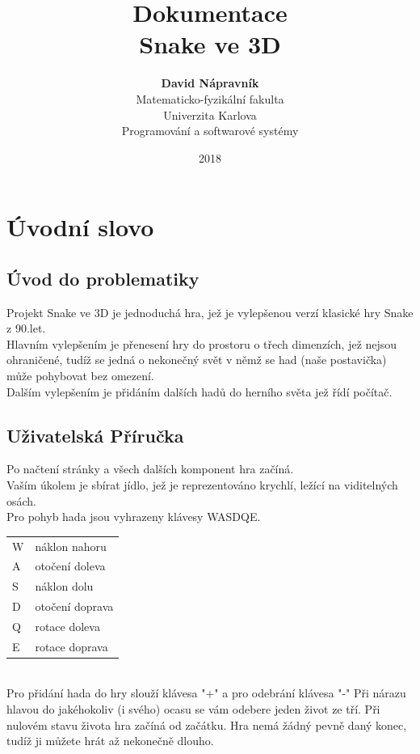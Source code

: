 \documentclass[a4paper,titlepage]{article}
\title{
	Dokumentace\\
	\textbf{Snake ve 3D}
}
\author{
	\textbf{David Nápravník}\\
	Matematicko-fyzikální fakulta\\
	Univerzita Karlova\\
	Programování a softwarové systémy
}
\date{2018}
\begin{document}
	\maketitle
	\tableofcontents
	\newpage
	
	\section{Úvodní slovo}
	\subsection{Úvod do problematiky}
		Projekt Snake ve 3D je jednoduchá hra, jež je vylepšenou verzí klasické hry Snake z 90.let.\cite{Snake-wikipedie}\\
		Hlavním vylepšením je přenesení hry do prostoru o třech dimenzích, jež nejsou ohraničené, tudíž se
		jedná o nekonečný svět v němž se had (naše postavička) může pohybovat bez omezení.\\
		Dalším vylepšením je přidáním dalších hadů do herního světa jež řídí počítač.
	\subsection{Uživatelská Příručka}
		Po načtení stránky a všech dalších komponent hra začíná.\\
		Vaším úkolem je sbírat jídlo, jež je reprezentováno krychlí, ležící na viditelných osách.\\
		Pro pohyb hada jsou vyhrazeny klávesy WASDQE.		
		\begin{table}[ht]
			\begin{tabular}{ll}
				W	&	náklon nahoru\\
				A 	& 	otočení doleva\\
				S 	&	náklon dolu\\
				D 	& 	otočení doprava\\
				Q 	& 	rotace doleva\\
				E 	& 	rotace doprava
			\end{tabular}
		\end{table}
		\\
		Pro přidání hada do hry slouží klávesa "+" a pro odebrání klávesa "-"
		Při nárazu hlavou do jakéhokoliv (i svého) ocasu se vám odebere jeden život ze tří.
		Při nulovém stavu života hra začíná od začátku.
		Hra nemá žádný pevně daný konec, tudíž ji můžete hrát až nekonečně dlouho.\\
		
\end{document}
